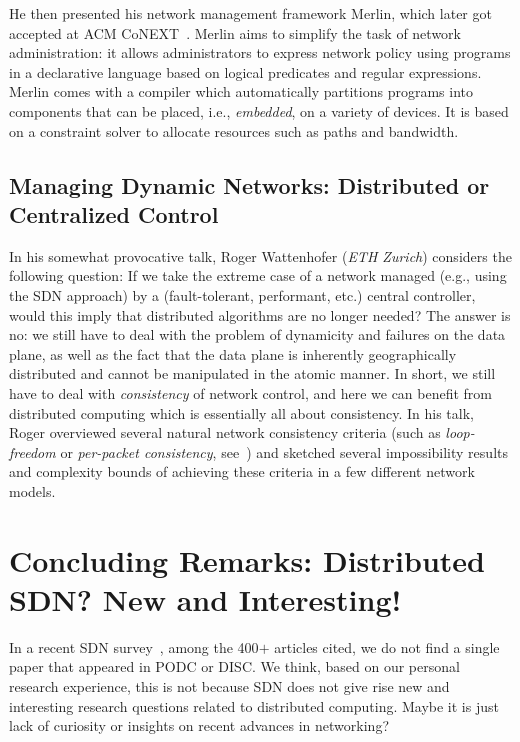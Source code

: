 \documentclass[11pt,pdftex,letter]{article}
\begin{document}
He then presented his network management framework Merlin, which later got
accepted at ACM CoNEXT~\cite{merlin}. Merlin aims to
simplify the task of network administration: it
allows administrators to express network policy using programs in a declarative language based on logical predicates and regular expressions.
Merlin comes with a compiler which automatically partitions programs into components that can be placed, i.e., \emph{embedded}, on a variety of devices.
It is based on a constraint solver to allocate resources such as paths and bandwidth.

\subsection{Managing Dynamic Networks: Distributed or Centralized
  Control}

In his somewhat provocative talk, Roger Wattenhofer ({\em ETH Zurich}) considers
the following question: If we take the extreme case of a network
managed (e.g., using the SDN approach) by a (fault-tolerant,
performant, etc.) central controller, would this imply
that distributed algorithms are no longer needed? The answer is no: we still have to deal with the problem of
dynamicity and failures on the data plane, as well as the fact that
the data plane is inherently geographically distributed and cannot be
manipulated in the atomic manner. In short, we still have to deal with
\emph{consistency} of network control, and here we can benefit from
distributed computing which is essentially all about consistency.
In his talk, Roger overviewed several natural network consistency
criteria (such as \emph{loop-freedom} or \emph{per-packet
  consistency}, see~\cite{roger-hotnets}) and sketched several impossibility results and
complexity bounds of achieving these criteria in a few different
network models.


\section{Concluding Remarks: Distributed SDN? New and Interesting!}

In a recent SDN survey~\cite{sdn-survey}, among the 400$+$ articles cited,
we do not find
a single paper that appeared in PODC or DISC.
We think, based on our personal research experience, this is not
because SDN does not give rise new and interesting
research questions related to distributed computing.
Maybe it is just lack of curiosity or insights on recent
advances in networking?
\end{document}
